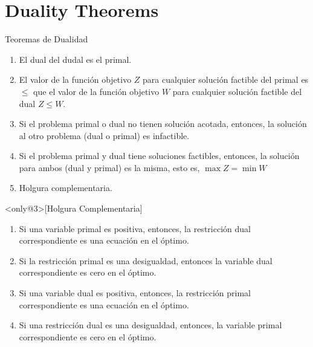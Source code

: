 
\section{Duality Theorems}
\label{sec:duality-theorems}

\begin{frame}{Teoremas de Dualidad}
  \begin{enumerate} \justifying \parskip4mm
\item<only@1> El dual del dudal es el primal.
\item<only@1> El valor de la función objetivo $Z$ para cualquier solución factible del primal es $\leq$ que el valor de la función objetivo $W$ para cualquier solución factible del dual $Z \leq W$.
\item<only@1> Si el problema primal o dual no tienen solución acotada, entonces, la solución al otro problema (dual o primal) es infactible.
\item<only@2> Si el problema primal y dual tiene soluciones factibles, entonces, la solución para ambos (dual y primal) es la misma, esto es, $\max Z = \min W$
\item<only@2> Holgura complementaria.
\end{enumerate}

\begin{theorem}<only@3>[Holgura Complementaria]
  \begin{enumerate} \justifying \parskip2mm
  \item Si una variable primal es positiva, entonces, la restricción dual correspondiente es una ecuación en el óptimo.
  \item Si la restricción primal es una desigualdad, entonces la variable dual correspondiente es cero en el óptimo.
  \item Si una variable dual es positiva, entonces, la restricción primal correspondiente es una ecuación en el óptimo.
  \item Si una restricción dual es una desigualdad, entonces, la variable primal correspondiente es cero en el óptimo.
  \end{enumerate}
\end{theorem}
\end{frame}

